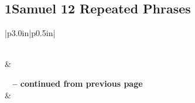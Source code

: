 \subsection{1Samuel 12 Repeated Phrases}


\normalsize
 
\begin{center}
\begin{longtable}{|p{3.0in}|p{0.5in}|}
\caption[1Samuel 12 Repeated Phrases]{1Samuel 12 Repeated Phrases}\label{table:Repeated Phrases 1Samuel 12} \\
\hline {} &  \\ \hline 
\endfirsthead
 
{{\bfseries \tablename\ \thetable{} -- continued from previous page}} \\  
\hline {} &  \\ \hline 
\endhead
 

\end{longtable}
\end{center}
